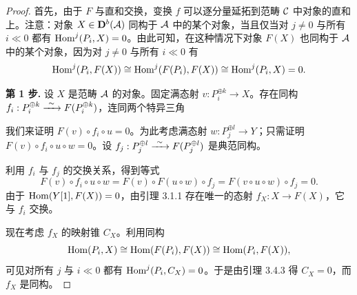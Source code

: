 \begin{proof}
首先，由于 $F$ 与直和交换，变换 $f$ 可以逐分量延拓到范畴 $\mathcal{C}$ 中对象的直和上。注意：对象 $X\in\mathbf{D}^{b}(\mathcal{A})$ 同构于 $\mathcal{A}$ 中的某个对象，当且仅当对 $j\neq 0$ 与所有 $i\ll 0$ 都有 $\operatorname{Hom}^{j}(P_i,X)=0$。由此可知，在这种情况下对象 $F(X)$ 也同构于 $\mathcal{A}$ 中的某个对象，因为对 $j\neq 0$ 与所有 $i\ll 0$ 有
\begin{equation*}
\operatorname{Hom}^{j}(P_i,F(X))\cong\operatorname{Hom}^{j}(F(P_i),F(X))\cong\operatorname{Hom}^{j}(P_i,X)=0.
\end{equation*}

\textbf{第 1 步.} 设 $X$ 是范畴 $\mathcal{A}$ 的对象。固定满态射 $v:P_i^{\oplus k}\longrightarrow X$。存在同构 $f_i:P_i^{\oplus k}\xrightarrow{\ \sim\ } F(P_i^{\oplus k})$，连同两个特异三角
\begin{center}
\end{center}
我们来证明 $F(v)\circ f_i\circ u=0$。为此考虑满态射 $w:P_j^{\oplus l}\longrightarrow Y$；只需证明 $F(v)\circ f_i\circ u\circ w=0$。设 $f_j:P_j^{\oplus l}\xrightarrow{\ \sim\ } F(P_j^{\oplus l})$ 是典范同构。

利用 $f_i$ 与 $f_j$ 的交换关系，得到等式
\begin{equation*}
F(v)\circ f_i\circ u\circ w=F(v)\circ F(u\circ w)\circ f_j=F(v\circ u\circ w)\circ f_j=0.
\end{equation*}
由于 $\operatorname{Hom}(Y[1],F(X))=0$，由引理 3.1.1 存在唯一的态射 $f_X:X\longrightarrow F(X)$，它与 $f_i$ 交换。

现在考虑 $f_X$ 的映射锥 $C_X$。利用同构
\begin{equation*}
\operatorname{Hom}(P_i,X)\cong\operatorname{Hom}(F(P_i),F(X))\cong\operatorname{Hom}(P_i,F(X)),
\end{equation*}
可见对所有 $j$ 与 $i\ll 0$ 都有 $\operatorname{Hom}^{j}(P_i,C_X)=0$。于是由引理 3.4.3 得 $C_X=0$，而 $f_X$ 是同构。


\end{proof}
